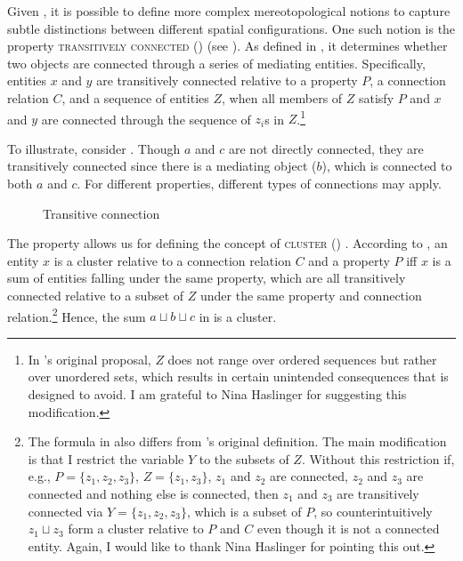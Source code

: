 \documentclass[output=paper]{langscibook}
\begin{document}
Given , it is possible to define more complex mereotopological notions to capture subtle distinctions between different spatial configurations. One such notion is the property \textsc{transitively connected} () (see \citealt[144]{grimm2012number}). As defined in , it determines whether  two objects are connected through a series of mediating entities. Specifically, entities $x$ and $y$ are transitively connected relative to a property $P$, a connection relation $C$, and a sequence of entities $Z$, when all members of $Z$ satisfy $P$ and $x$ and $y$ are connected through the sequence of $z_i$s in $Z$.\footnote{In \citeauthor{grimm2012number}'s original proposal, $Z$ does not range over ordered sequences but rather over unordered sets, which results in certain unintended consequences that  is designed to avoid. I am grateful to Nina Haslinger for suggesting this modification.}

\label{wan:form:transitively-connected}
\z

\noindent To illustrate, consider . Though $a$ and $c$ are not directly connected, they are transitively connected since there is a mediating object ($b$), which is connected to both $a$ and $c$. For different properties, different types of connections may apply.

\begin{figure}[h!]
\centering
{}
\caption{Transitive connection}
\label{wan:fig:cluster}
\end{figure}

The property  allows us for defining the concept of \textsc{cluster} () \citep[144]{grimm2012number}. According to , an entity $x$ is a cluster relative to a connection relation $C$ and a property $P$ iff $x$ is a sum of entities falling under the same property, which are all transitively connected relative to a subset of $Z$ under the same property and connection relation.\footnote{The formula in  also differs from \citeauthor{grimm2012number}'s original definition. The main modification is that I restrict the variable $Y$ to the subsets of $Z$. Without this restriction if, e.g., $P=\{z_1,z_2,z_3\}$, $Z=\{z_1,z_3\}$, $z_1$ and $z_2$ are connected, $z_2$ and $z_3$ are connected and nothing else is connected, then $z_1$ and $z_3$ are transitively connected via $Y=\{z_1,z_2,z_3\}$, which is a subset of $P$, so counterintuitively $z_1 \sqcup z_3$ form a cluster relative to $P$ and $C$ even though it is not a connected entity. Again, I would like to thank Nina Haslinger for pointing this out.} Hence, the sum $a\sqcup b\sqcup c$ in  is a cluster.
\end{document}
